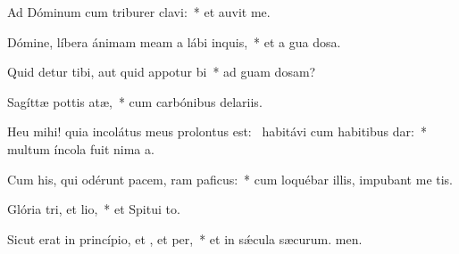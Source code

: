 \item Ad Dóminum cum triburer clavi:~* et auvit me.
\item Dómine, líbera ánimam meam a lábi inquis,~* et a gua dosa.
\item Quid detur tibi, aut quid appotur bi~* ad guam dosam?
\item Sagíttæ pottis atæ,~* cum carbónibus delariis.
\item Heu mihi! quia incolátus meus prolontus est:~\pscross{} habitávi cum habitibus dar:~* multum íncola fuit nima a.
\item Cum his, qui odérunt pacem, ram paficus:~* cum loquébar illis, impubant me tis.
\item Glória tri, et lio,~* et Spitui to.
\item Sicut erat in princípio, et , et per,~* et in sǽcula sæcurum. men.
